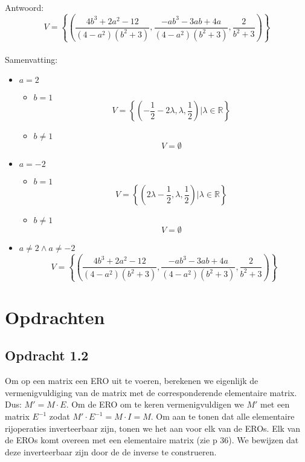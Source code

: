 \documentclass[lineaire_algebra_oplossingen.tex]{subfiles}
\begin{document}
Antwoord:
\[
V = \left\lbrace\left(\frac{4b^{3}+2a^{2}-12}{(4-a^{2})(b^{2}+3)},\frac{-ab^{3}-3ab+4a}{(4-a^{2})(b^{2}+3)},\frac{2}{b^{2}+3}\right)\right\rbrace
\]
\\Samenvatting:
\begin{itemize}
\item $a=2$
\begin{itemize}
\item $b=1$
\[
V = \left\lbrace \left(-\frac{1}{2}-2\lambda,\lambda,\frac{1}{2}\right)| \lambda \in \mathbb{R}\right\rbrace
\]
\item $b\neq 1$
\[
V = \emptyset
\]
\end{itemize}
\item $a=-2$
\begin{itemize}
\item $b=1$
\[
V= \left\lbrace \left(2\lambda-\frac{1}{2},\lambda,\frac{1}{2}\right)| \lambda \in \mathbb{R}\right\rbrace
\]
\item $b\neq 1$
\[
V= \emptyset
\]
\end{itemize}
\item $a\neq 2 \wedge a \neq -2$ 
\[
V = \left\lbrace\left(\frac{4b^{3}+2a^{2}-12}{(4-a^{2})(b^{2}+3)},\frac{-ab^{3}-3ab+4a}{(4-a^{2})(b^{2}+3)},\frac{2}{b^{2}+3}\right)\right\rbrace
\]
\end{itemize}

\section{Opdrachten}
\subsection{Opdracht 1.2}
\label{1.2}
Om op een matrix een ERO uit te voeren, berekenen we eigenlijk de vermenigvuldiging van de matrix met de corresponderende elementaire matrix. Dus: $M' = M \cdot E$. Om de ERO om te keren vermenigvuldigen we $M'$ met een matrix $E^{-1}$ zodat $M'\cdot E^{-1} = M \cdot I = M$.
Om aan te tonen dat alle elementaire rijoperaties inverteerbaar zijn, tonen we het aan voor elk van de EROs. Elk van de EROs komt overeen met een elementaire matrix (zie p 36). We bewijzen dat deze inverteerbaar zijn door de de inverse te construeren.
\end{document}
